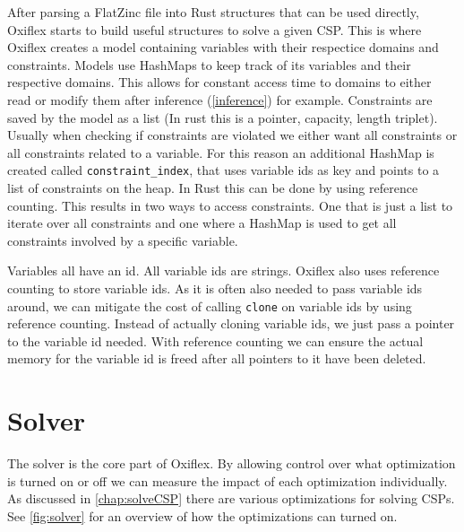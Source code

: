 After parsing a FlatZinc file into Rust structures that can be used directly, Oxiflex starts to build useful structures to solve a given CSP. This is where Oxiflex creates a model containing variables with their respectice domains and constraints. Models use HashMaps to keep track of its variables and their respective domains. This allows for constant access time to domains to either read or modify them after inference (\ref{inference}) for example. Constraints are saved by the model as a list (In rust this is a pointer, capacity, length triplet). Usually when checking if constraints are violated we either want all constraints or all constraints related to a variable. For this reason an additional HashMap is created called \verb|constraint_index|, that uses variable ids as key and points to a list of constraints on the heap. In Rust this can be done by using reference counting. This results in two ways to access constraints. One that is just a list to iterate over all constraints and one where a HashMap is used to get all constraints involved by a specific variable.

Variables all have an id. All variable ids are strings. Oxiflex also uses reference counting to store variable ids. As it is often also needed to pass variable ids around, we can mitigate the cost of calling \verb|clone| on variable ids by using reference counting. Instead of actually cloning variable ids, we just pass a pointer to the variable id needed. With reference counting we can ensure the actual memory for the variable id is freed after all pointers to it have been deleted.

\section{Solver}

The solver is the core part of Oxiflex. By allowing control over what optimization is turned on or off we can measure the impact of each optimization individually. As discussed in \cref{chap:solveCSP} there are various optimizations for solving CSPs. See \cref{fig:solver} for an overview of how the optimizations can turned on. \\

